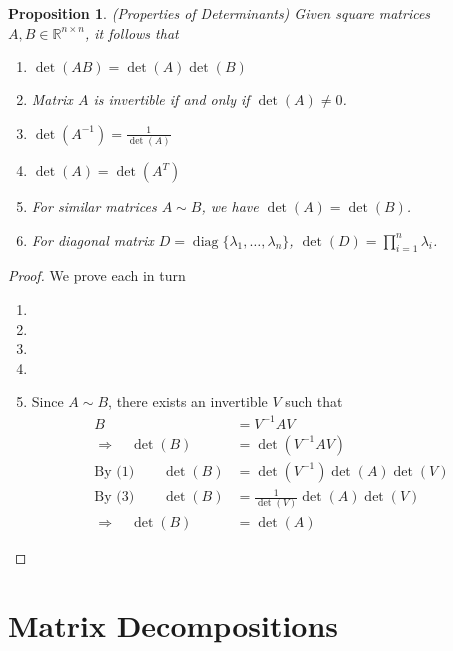 \documentclass[12pt]{book}
\numberwithin{equation}{section} %
\theoremstyle{plain}
\newtheorem{prop}[thm]{Proposition}
\theoremstyle{definition}
\theoremstyle{remark}
\newcommand{\diag}{\operatorname{diag}}
\newcommand{\R}{\mathbb{R}}
\begin{document}
\begin{prop}{\emph{(Properties of Determinants)}}
Given square matrices $A,B\in \R^{n\times n}$, it follows that
\begin{enumerate}
  \item $\det(AB) = \det(A) \det(B)$
  \item Matrix $A$ is invertible if and only if $\det(A) \neq 0$.
  \item $\det(A^{-1}) = \frac{1}{\det(A)}$
  \item $\det(A) = \det(A^T)$
  \item For similar matrices $A\sim B$, we have $\det(A) = \det(B)$.
  \item For diagonal matrix $D=\diag\{\lambda_1,\ldots,\lambda_n\}$,
    $\det(D) = \prod^n_{i=1} \lambda_i$.
\end{enumerate}
\end{prop}
\begin{proof}
We prove each in turn
\begin{enumerate}
  \item
  \item
  \item
  \item
  \item Since $A\sim B$, there exists an invertible $V$ such that
    \begin{align*}
      B &= V^{-1} A V\\
      \Rightarrow\quad
      \det(B) &= \det(V^{-1} A V)\\
      \text{By (1)} \quad\quad
      \det(B) &= \det(V^{-1}) \det(A) \det(V)\\
      \text{By (3)} \quad\quad
      \det(B) &= \frac{1}{\det(V)} \det(A) \det(V)\\
      \Rightarrow\quad
      \det(B) &= \det(A)
    \end{align*}
\end{enumerate}
\end{proof}








\section{Matrix Decompositions}
\label{subsec:decomp}
\end{document}
